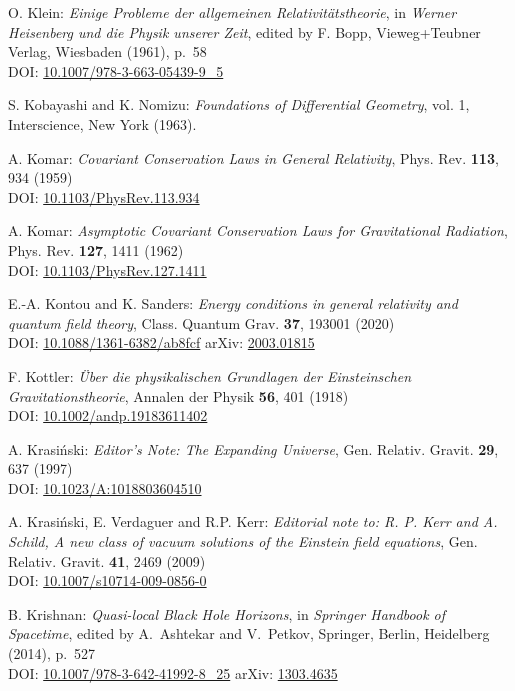 \begin{thebibliography}{123}
O. Klein:
{\em Einige Probleme der allgemeinen Relativitätstheorie},
in {\em Werner Heisenberg und die Physik unserer Zeit},
edited by F. Bopp, Vieweg+Teubner Verlag, Wiesbaden (1961), p.~58\\
DOI: \href{https://doi.org/10.1007/978-3-663-05439-9_5}{10.1007/978-3-663-05439-9\_5}

S. Kobayashi and K. Nomizu:
{\em Foundations of Differential Geometry}, vol. 1,
Interscience, New York (1963).

A. Komar:
{\em Covariant Conservation Laws in General Relativity},
Phys. Rev. {\bf 113}, 934 (1959)\\
DOI: \href{https://doi.org/10.1103/PhysRev.113.934}{10.1103/PhysRev.113.934}

A. Komar:
{\em Asymptotic Covariant Conservation Laws for Gravitational Radiation},
Phys. Rev. {\bf 127}, 1411 (1962)\\
DOI: \href{https://doi.org/10.1103/PhysRev.127.1411}{10.1103/PhysRev.127.1411}

E.-A. Kontou and K. Sanders:
{\em Energy conditions in general relativity and quantum field theory},
Class. Quantum Grav. {\bf 37}, 193001 (2020)\\
DOI: \href{https://doi.org/10.1088/1361-6382/ab8fcf}{10.1088/1361-6382/ab8fcf}\hfill
arXiv: \href{https://arxiv.org/abs/2003.01815}{2003.01815}

F.  Kottler:
{\em \"Uber die physikalischen Grundlagen der Einsteinschen Gravitationstheorie},
Annalen der Physik {\bf 56}, 401 (1918)\\
DOI: \href{https://doi.org/10.1002/andp.19183611402}{10.1002/andp.19183611402}

A. Krasi\'nski:
{\em Editor's Note: The Expanding Universe},
Gen. Relativ. Gravit. {\bf 29}, 637 (1997)\\
DOI: \href{https://doi.org/10.1023/A:1018803604510}{10.1023/A:1018803604510}

A. Krasi\'nski, E. Verdaguer and R.P. Kerr:
{\em Editorial note to: R. P. Kerr and A. Schild, A new class of vacuum solutions of the Einstein field equations},
Gen. Relativ. Gravit. {\bf 41}, 2469 (2009)\\
DOI: \href{https://doi.org/10.1007/s10714-009-0856-0}{10.1007/s10714-009-0856-0}

B. Krishnan:
{\em Quasi-local Black Hole Horizons},
in {\em Springer Handbook of Spacetime}, edited by A.~Ashtekar and V.~Petkov,
Springer, Berlin, Heidelberg (2014), p.~527\\
DOI: \href{https://doi.org/10.1007/978-3-642-41992-8_25}{10.1007/978-3-642-41992-8\_25}\hfill
arXiv: \href{https://arxiv.org/abs/1303.4635}{1303.4635}


\end{thebibliography}
